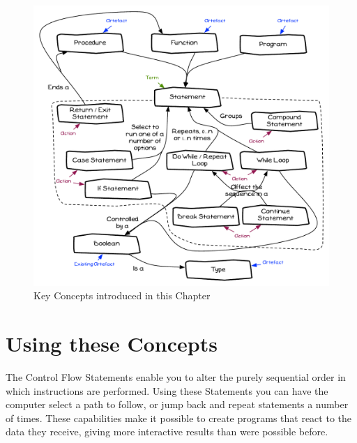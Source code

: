 \begin{figure}[h]
   \centering
   \includegraphics[width=\textwidth]{./topics/control-flow/diagrams/Summary} 
   \caption[Chapter Concepts]{Key Concepts introduced in this Chapter}
   \label{fig:control-flow-summary}
\end{figure}



\clearpage
\section{Using these Concepts} %
\label{sec:control_flow_using_these_concepts}

The Control Flow Statements enable you to alter the purely sequential order in which instructions are performed. Using these Statements you can have the computer select a path to follow, or jump back and repeat statements a number of times. These capabilities make it possible to create programs that react to the data they receive, giving more interactive results than were possible before.

